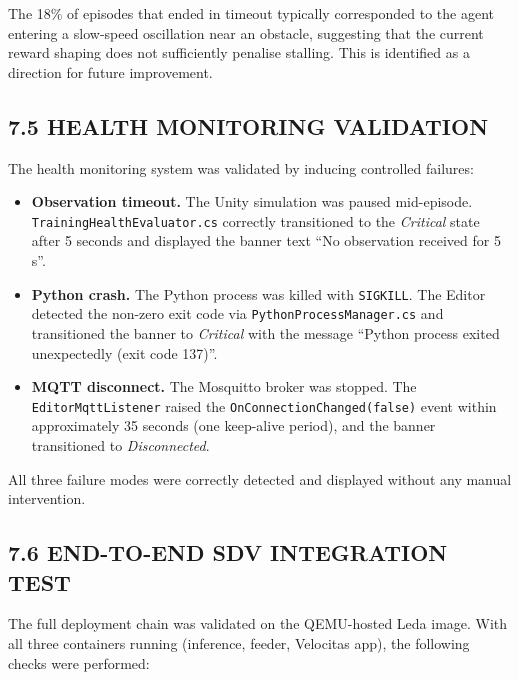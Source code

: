 \documentclass[12pt,a4paper]{article}
\begin{document}
The 18\% of episodes that ended in timeout typically corresponded to the
agent entering a slow-speed oscillation near an obstacle, suggesting that
the current reward shaping does not sufficiently penalise stalling. This
is identified as a direction for future improvement.

\subsection*{7.5 \quad HEALTH MONITORING VALIDATION}

\indent The health monitoring system was validated by inducing controlled
failures:

\begin{itemize}
  \item \textbf{Observation timeout.} The Unity simulation was paused
    mid-episode. \texttt{TrainingHealthEvaluator.cs} correctly transitioned
    to the \emph{Critical} state after 5 seconds and displayed the banner
    text ``No observation received for 5 s''.
  \item \textbf{Python crash.} The Python process was killed with
    \texttt{SIGKILL}. The Editor detected the non-zero exit code via
    \texttt{PythonProcessManager.cs} and transitioned the banner to
    \emph{Critical} with the message ``Python process exited unexpectedly
    (exit code 137)''.
  \item \textbf{MQTT disconnect.} The Mosquitto broker was stopped. The
    \texttt{EditorMqttListener} raised the \texttt{OnConnectionChanged(false)}
    event within approximately 35 seconds (one keep-alive period), and the
    banner transitioned to \emph{Disconnected}.
\end{itemize}

All three failure modes were correctly detected and displayed without any
manual intervention.

\subsection*{7.6 \quad END-TO-END SDV INTEGRATION TEST}

\indent The full deployment chain was validated on the QEMU-hosted Leda image.
With all three containers running (inference, feeder, Velocitas app), the
following checks were performed:
\end{document}
